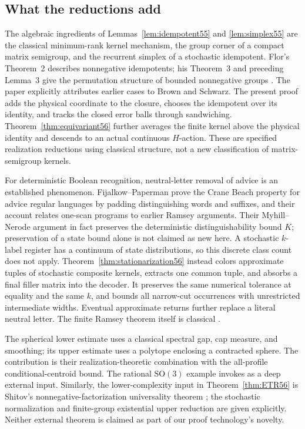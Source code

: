 \subsection{What the reductions add}
The algebraic ingredients of Lemmas~\ref{lem:idempotent55} and \ref{lem:simplex55} are the classical minimum-rank kernel mechanism, the group corner of a compact matrix semigroup, and the recurrent simplex of a stochastic idempotent. Flor's Theorem~2 describes nonnegative idempotents; his Theorem~3 and preceding Lemma~3 give the permutation structure of bounded nonnegative groups \cite{Flor}. The paper explicitly attributes earlier cases to Brown and Schwarz. The present proof adds the physical coordinate to the closure, chooses the idempotent over its identity, and tracks the closed error balls through sandwiching. Theorem~\ref{thm:equivariant56} further averages the finite kernel above the physical identity and descends to an actual continuous $H$-action. These are specified realization reductions using classical structure, not a new classification of matrix-semigroup kernels.

For deterministic Boolean recognition, neutral-letter removal of advice is an established phenomenon. Fijalkow--Paperman \cite[Theorem~10]{FP} prove the Crane Beach property for advice regular languages by padding distinguishing words and suffixes, and their account relates one-scan programs to earlier Ramsey arguments. Their Myhill--Nerode argument in fact preserves the deterministic distinguishability bound $K$; preservation of a state bound alone is not claimed as new here. A stochastic $k$-label register has a continuum of state distributions, so this discrete class count does not apply. Theorem~\ref{thm:stationarization56} instead colors approximate tuples of stochastic composite kernels, extracts one common tuple, and absorbs a final filler matrix into the decoder. It preserves the same numerical tolerance at equality and the same $k$, and bounds all narrow-cut occurrences with unrestricted intermediate widths. Eventual approximate returns further replace a literal neutral letter. The finite Ramsey theorem itself is classical \cite{Ramsey}.

The spherical lower estimate uses a classical spectral gap, cap measure, and smoothing; its upper estimate uses a polytope enclosing a contracted sphere. The contribution is their realization-theoretic combination with the all-profile conditional-centroid bound. The rational $\mathrm{SO}(3)$ example invokes \cite{BG2012} as a deep external input. Similarly, the lower-complexity input in Theorem~\ref{thm:ETR56} is Shitov's nonnegative-factorization universality theorem \cite{Shitov}; the stochastic normalization and finite-group existential upper reduction are given explicitly. Neither external theorem is claimed as part of our proof technology's novelty.

